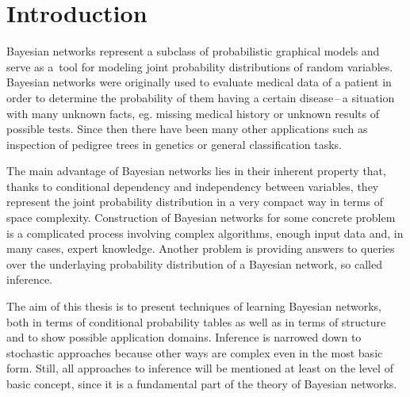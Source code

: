 \documentclass[english,cover]{fitthesis} %
\begin{document}
  \maketitle
  \tableofcontents
  


  









\chapter{Introduction}
Bayesian networks represent a subclass of probabilistic graphical models and serve as a~tool for modeling joint probability distributions of random variables. Bayesian networks were originally used to evaluate medical data of a patient in order to determine the probability of them having a certain disease\,--\,a situation with many unknown facts, eg. missing medical history or unknown results of possible tests. Since then there have been many other applications such as inspection of pedigree trees in genetics or general classification tasks.

The main advantage of Bayesian networks lies in their inherent property that, thanks to conditional dependency and independency between variables, they represent the joint probability distribution in a very compact way in terms of space complexity. Construction of Bayesian networks for some concrete problem is a complicated process involving complex algorithms, enough input data and, in many cases, expert knowledge. Another problem is providing answers to queries over the underlaying probability distribution of a Bayesian network, so called inference.

The aim of this thesis is to present techniques of learning Bayesian networks, both in terms of conditional probability tables as well as in terms of structure and to show possible application domains. Inference is narrowed down to stochastic approaches because other ways are complex even in the most basic form. Still, all approaches to inference will be mentioned at least on the level of basic concept, since it is a fundamental part of the theory of Bayesian networks.
\end{document}
